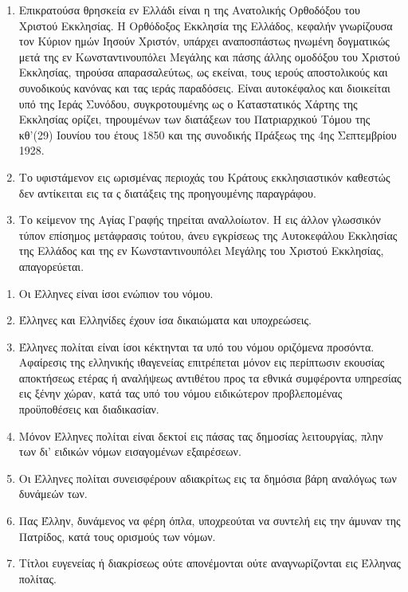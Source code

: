 \documentclass[twoside, a4paper, 10pt]{article}
\begin{document}
\begin{multicols}{2}
\begin{enumerate}
\begin{BigQuote}
\begin{enumerate}
  \item[1.] Επικρατούσα θρησκεία εν Ελλάδι είναι η της Ανατολικής Ορθοδόξου του Χριστού Εκκλησίας. Η Ορθόδοξος Εκκλησία της Ελλάδος, κεφαλήν γνωρίζουσα τον Κύριον ημών Ιησούν Χριστόν, υπάρχει αναποσπάστως ηνωμένη δογματικώς μετά της εν Κωνσταντινουπόλει Μεγάλης και πάσης άλλης ομοδόξου του Χριστού Εκκλησίας, τηρούσα απαρασαλεύτως, ως εκείναι, τους ιερούς αποστολικούς και συνοδικούς κανόνας και τας ιεράς παραδόσεις. Είναι αυτοκέφαλος και διοικείται υπό της Ιεράς Συνόδου, συγκροτουμένης ως ο Καταστατικός Χάρτης της Εκκλησίας ορίζει, τηρουμένων των διατάξεων του Πατριαρχικού Τόμου της κθ'(29) Ιουνίου του έτους 1850 και της συνοδικής Πράξεως της 4ης Σεπτεμβρίου 1928.
  \item[2.] Το υφιστάμενον εις ωρισμένας περιοχάς του Κράτους εκκλησιαστικόν καθεστώς δεν αντίκειται εις τα ς διατάξεις της προηγουμένης παραγράφου.
  \item[3.] Το κείμενον της Αγίας Γραφής τηρείται αναλλοίωτον. Η εις άλλον γλωσσικόν τύπον επίσημος μετάφρασις τούτου, άνευ εγκρίσεως της Αυτοκεφάλου Εκκλησίας της Ελλάδος και της εν Κωνσταντινουπόλει Μεγάλης του Χριστού Εκκλησίας, απαγορεύεται.
\end{enumerate}

\begin{enumerate}
  \item[1.] Οι Έλληνες είναι ίσοι ενώπιον του νόμου.
  \item[2.] Έλληνες και Ελληνίδες έχουν ίσα δικαιώματα και υποχρεώσεις.
  \item[3.] Έλληνες πολίται είναι ίσοι κέκτηνται τα υπό του νόμου οριζόμενα προσόντα. Αφαίρεσις της ελληνικής ιθαγενείας επιτρέπεται μόνον εις περίπτωσιν εκουσίας αποκτήσεως ετέρας ή αναλήψεως αντιθέτου προς τα εθνικά συμφέροντα υπηρεσίας εις ξένην χώραν, κατά τας υπό του νόμου ειδικώτερον προβλεπομένας προϋποθέσεις και διαδικασίαν.
  \item[4.] Μόνον Έλληνες πολίται είναι δεκτοί εις πάσας τας δημοσίας λειτουργίας, πλην των δι' ειδικών νόμων εισαγομένων εξαιρέσεων.
  \item[5.] Οι Έλληνες πολίται συνεισφέρουν αδιακρίτως εις τα δημόσια βάρη αναλόγως των δυνάμεών των.
  \item[6.] Πας Έλλην, δυνάμενος να φέρη όπλα, υποχρεούται να συντελή εις την άμυναν της Πατρίδος, κατά τους ορισμούς των νόμων.
  \item[7.] Τίτλοι ευγενείας ή διακρίσεως ούτε απονέμονται ούτε αναγνωρίζονται εις Έλληνας πολίτας.
\end{enumerate}


\end{BigQuote}
\end{enumerate}
\end{multicols}
\end{document}
